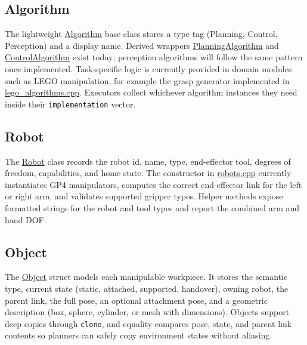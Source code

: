 \documentclass{article}
\begin{document}
\subsection{Algorithm}\label{sec:algorithms}
The lightweight \href{https://github.com/intelligent-control-lab/AIDF/blob/main/skillgraph/api/algorithms.hpp#L14}{Algorithm} base class stores a type tag (Planning, Control, Perception) and a display name. Derived wrappers \href{https://github.com/intelligent-control-lab/AIDF/blob/main/skillgraph/api/algorithms.hpp#L32}{PlanningAlgorithm} and \href{https://github.com/intelligent-control-lab/AIDF/blob/main/skillgraph/api/algorithms.hpp#L42}{ControlAlgorithm} exist today; perception algorithms will follow the same pattern once implemented. Task-specific logic is currently provided in domain modules such as LEGO manipulation, for example the grasp generator implemented in \href{https://github.com/intelligent-control-lab/AIDF/blob/main/skillgraph/src/lego/lego_algorithms.cpp#L13}{lego_algorithms.cpp}. Executors collect whichever algorithm instances they need inside their \texttt{implementation} vector.

\subsection{Robot}
The \href{https://github.com/intelligent-control-lab/AIDF/blob/main/skillgraph/api/robots.hpp#L14}{Robot} class records the robot id, name, type, end-effector tool, degrees of freedom, capabilities, and home state. The constructor in \href{https://github.com/intelligent-control-lab/AIDF/blob/main/skillgraph/src/robots.cpp#L13}{robots.cpp} currently instantiates GP4 manipulators, computes the correct end-effector link for the left or right arm, and validates supported gripper types. Helper methods expose formatted strings for the robot and tool types and report the combined arm and hand DOF.

\subsection{Object}
The \href{https://github.com/intelligent-control-lab/AIDF/blob/main/skillgraph/api/objects.hpp#L5}{Object} struct models each manipulable workpiece. It stores the semantic type, current state (static, attached, supported, handover), owning robot, the parent link, the full pose, an optional attachment pose, and a geometric description (box, sphere, cylinder, or mesh with dimensions). Objects support deep copies through \texttt{clone}, and equality compares pose, state, and parent link contents so planners can safely copy environment states without aliasing.
\end{document}
